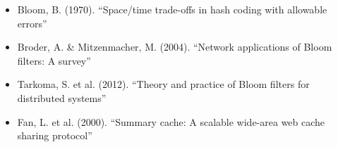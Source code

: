 \begin{itemize}
\item Bloom, B. (1970). ``Space/time trade-offs in hash coding with allowable errors''
\item Broder, A. \& Mitzenmacher, M. (2004). ``Network applications of Bloom filters: A survey''
\item Tarkoma, S. et al. (2012). ``Theory and practice of Bloom filters for distributed systems''
\item Fan, L. et al. (2000). ``Summary cache: A scalable wide-area web cache sharing protocol''
\end{itemize}

